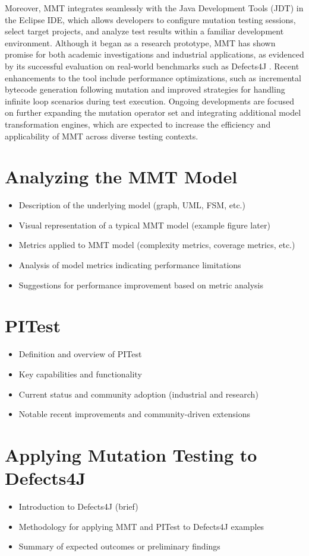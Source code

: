 \documentclass[sigplan, nonacm]{acmart}
\begin{document}
Moreover, MMT integrates seamlessly with the Java Development Tools (JDT) in the Eclipse IDE, which allows developers to configure mutation testing sessions, select target projects, and analyze test results within a familiar development environment. Although it began as a research prototype, MMT has shown promise for both academic investigations and industrial applications, as evidenced by its successful evaluation on real-world benchmarks such as Defects4J \cite{just_defects4j_2014}. Recent enhancements to the tool include performance optimizations, such as incremental bytecode generation following mutation and improved strategies for handling infinite loop scenarios during test execution. Ongoing developments are focused on further expanding the mutation operator set and integrating additional model transformation engines, which are expected to increase the efficiency and applicability of MMT across diverse testing contexts.

\section{Analyzing the MMT Model}
\begin{itemize}
	\item Description of the underlying model (graph, UML, FSM, etc.)
	\item Visual representation of a typical MMT model (example figure later)
	\item Metrics applied to MMT model (complexity metrics, coverage metrics, etc.)
	\item Analysis of model metrics indicating performance limitations
	\item Suggestions for performance improvement based on metric analysis
\end{itemize}

\section{PITest}
\begin{itemize}
	\item Definition and overview of PITest
	\item Key capabilities and functionality
	\item Current status and community adoption (industrial and research)
	\item Notable recent improvements and community-driven extensions
\end{itemize}

\section{Applying Mutation Testing to Defects4J}
\begin{itemize}
	\item Introduction to Defects4J (brief)
	\item Methodology for applying MMT and PITest to Defects4J examples
	\item Summary of expected outcomes or preliminary findings
\end{itemize}
\end{document}
